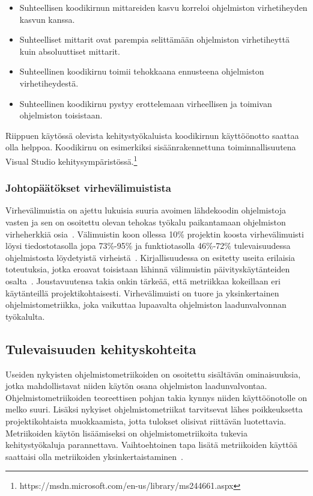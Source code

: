 \documentclass[finnish]{tktltiki2}
\theoremstyle{definition}
\theoremstyle{remark}
\begin{document}
\begin{itemize}
    \item Suhteellisen koodikirnun mittareiden kasvu korreloi ohjelmiston virhetiheyden kasvun kanssa.
    \item Suhteelliset mittarit ovat parempia selittämään ohjelmiston virhetiheyttä kuin absoluuttiset mittarit.
    \item Suhteellinen koodikirnu toimii tehokkaana ennusteena ohjelmiston virhetiheydestä.
    \item Suhteellinen koodikirnu pystyy erottelemaan virheellisen ja toimivan ohjelmiston toisistaan.
\end{itemize}

Riippuen käytössä olevista kehitystyökaluista koodikirnun käyttöönotto saattaa olla helppoa. Koodikirnu on esimerkiksi sisäänrakennettuna toiminnallisuutena Visual Studio kehitysympäristössä.\footnote{https://msdn.microsoft.com/en-us/library/ms244661.aspx}

\subsubsection{Johtopäätökset virhevälimuistista}

Virhevälimuistia on ajettu lukuisia suuria avoimen lähdekoodin ohjelmistoja vasten ja sen on osoitettu olevan tehokas työkalu paikantamaan ohjelmiston virheherkkiä osia~\cite{KZWZ07, RPHBD11}. Välimuistin koon ollessa 10\% projektin koosta virhevälimuisti löysi tiedostotasolla jopa 73\%-95\% ja funktiotasolla 46\%-72\% tulevaisuudessa ohjelmistosta löydetyistä virheistä~\cite{KZWZ07}. Kirjallisuudessa on esitetty useita erilaisia toteutuksia, jotka eroavat toisistaan lähinnä välimuistin päivityskäytänteiden osalta~\cite{ERW10, RPHBD11, SLLZW11, WFGWW09}. Joustavuutensa takia onkin tärkeää, että metriikkaa kokeillaan eri käytänteillä projektikohtaisesti. Virhevälimuisti on tuore ja yksinkertainen ohjelmistometriikka, joka vaikuttaa lupaavalta ohjelmiston laadunvalvonnan työkalulta.

\subsection{Tulevaisuuden kehityskohteita}

Useiden nykyisten ohjelmistometriikoiden on osoitettu sisältävän ominaisuuksia, jotka mahdollistavat niiden käytön osana ohjelmiston laadunvalvontaa. Ohjelmistometriikoiden teoreettisen pohjan takia kynnys niiden käyttöönotolle on melko suuri. Lisäksi nykyiset ohjelmistometriikat tarvitsevat lähes poikkeuksetta projektikohtaista muokkaamista, jotta tulokset olisivat riittävän luotettavia. Metriikoiden käytön lisäämiseksi on ohjelmistometriikoita tukevia kehitystyökaluja parannettava. Vaihtoehtoinen tapa lisätä metriikoiden käyttöä saattaisi olla metriikoiden yksinkertaistaminen~\cite{RPHBD11}.
\end{document}

